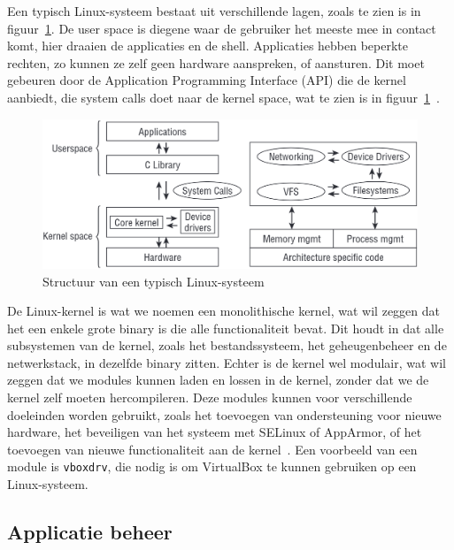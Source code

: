 Een typisch Linux-systeem bestaat uit verschillende lagen, zoals te zien is in figuur~\ref{fig:linux-system-structure}.
De user space is diegene waar de gebruiker het meeste mee in contact komt, hier draaien de applicaties en de shell.
Applicaties hebben beperkte rechten, zo kunnen ze zelf geen hardware aanspreken, of aansturen.
Dit moet gebeuren door de Application Programming Interface (API) die de kernel aanbiedt, die system calls doet naar de kernel space, wat te zien is in figuur~\ref{fig:linux-system-structure}~\autocite{mauerer2008linux}.

\begin{figure}[h!]
    \begin{center}
        \includegraphics[width=\textwidth]
        {./graphics/linux/kernel-structure.png}
        \caption[Structuur van Linux-systeem.]{\label{fig:linux-system-structure}Structuur van een typisch Linux-systeem~\autocite{mauerer2008linux}}
    \end{center}
\end{figure}

De Linux-kernel is wat we noemen een monolithische kernel, wat wil zeggen dat het een enkele grote binary is die alle functionaliteit bevat.
Dit houdt in dat alle subsystemen van de kernel, zoals het bestandssysteem, het geheugenbeheer en de netwerkstack, in dezelfde binary zitten.
Echter is de kernel wel modulair, wat wil zeggen dat we modules kunnen laden en lossen in de kernel, zonder dat we de kernel zelf moeten hercompileren.
Deze modules kunnen voor verschillende doeleinden worden gebruikt, zoals het toevoegen van ondersteuning voor nieuwe hardware, het beveiligen van het systeem met SELinux of AppArmor, of het toevoegen van nieuwe functionaliteit aan de kernel~\autocite{hypponen2021securing}.
Een voorbeeld van een module is \texttt{vboxdrv}, die nodig is om VirtualBox te kunnen gebruiken op een Linux-systeem.

\subsection{Applicatie beheer}
\label{linux_applicatie_beheer}

